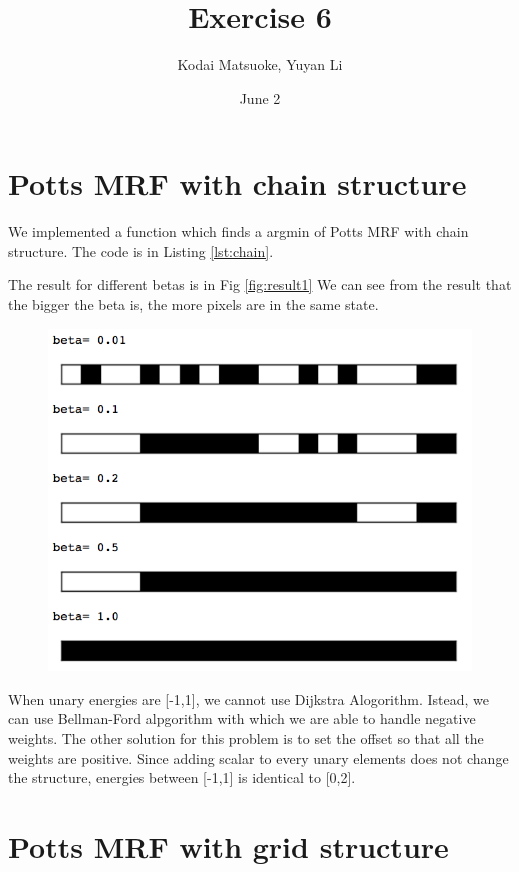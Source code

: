 \documentclass[12pt,a4paper]{scrartcl}
\author{Kodai Matsuoke, Yuyan Li}
\title{Exercise 6}
\date{June 2}
\begin{document}
\maketitle

\section{Potts MRF with chain structure}

We implemented a function which finds a argmin of Potts MRF with chain structure. The code is in Listing \ref{lst:chain}.



The result for different betas is in Fig \ref{fig:result1}
We can see from the result that the bigger the beta is, the more pixels are in the same state.

\begin{figure}
	\centering
    \includegraphics[width=15cm]{result1.png}
\end{figure}

When unary energies are [-1,1], we cannot use Dijkstra Alogorithm. Istead, we can use Bellman-Ford alpgorithm with which we are able to handle negative weights. The other solution for this problem is to set the offset so that all the weights are positive. Since adding scalar to every unary elements does not change the structure, energies between [-1,1] is identical to [0,2].


\section{Potts MRF with grid structure}
\end{document}
